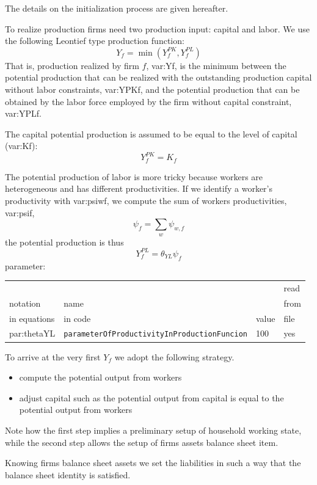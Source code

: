 \documentclass{book}
\begin{document}
The details on the initialization process are given hereafter.


To realize production firms need two production input: capital and labor. We use the following Leontief type production function:
\begin{equation}
Y_f=\min(Y_f^{PK},Y_f^{PL})
	\label{eq:production_function}
\end{equation}
That is, production realized by firm $f$, \gls{var:Yf}, is the minimum between the potential production that can be realized with the outstanding production capital without labor constraints, \gls{var:YPKf}, and the potential production that can be obtained by the labor force employed by the firm without capital constraint, \gls{var:YPLf}. 


The capital potential production is assumed to be equal to the level of capital (\gls{var:Kf}):
\[
	Y^{PK}_f=K_f
\]

The potential production of labor is more tricky because workers are heterogeneous and has different productivities.
If we identify a worker's productivity with \gls{var:psiwf}, we compute the sum of workers productivities, \gls{var:psif},
\[
	\psi_f=\sum_{w}\psi_{w,f}
\]
the potential production is thus
\[
	Y^{PL}_f=\theta_{YL}\psi_f
\]
parameter:\\
\begin{tabular}{l l l l}
	\hline
	& &&read\\
	notation& name &&from\\
	in equations& in code&value&file\\
	\hline
	\hline
	\gls{par:thetaYL}&\verb+parameterOfProductivityInProductionFuncion+&100&yes\\
	\hline
\end{tabular}

\vskip5mm
To arrive at the very first $Y_f$ we adopt the following strategy. 
\begin{itemize}
	\item compute the potential output from workers
	\item adjust capital such as the potential output from capital is equal to the potential output from workers 
\end{itemize}

Note how the first step implies a preliminary setup of household working state, while the second step allows the setup of firms assets balance sheet item. 

Knowing firms balance sheet assets we set the liabilities in such a way that the balance sheet identity is satisfied.
\end{document}
